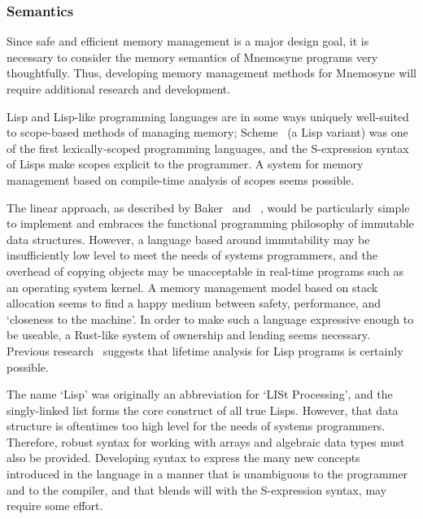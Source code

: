 \documentclass[11pt,draft]{article}
\theoremstyle{break}
\begin{document}
\subsubsection{Semantics}

Since safe and efficient memory management is a major design goal, it is necessary to consider the memory semantics of Mnemosyne programs very thoughtfully. Thus, developing memory management methods for Mnemosyne will require additional research and development.

Lisp and Lisp-like programming languages are in some ways uniquely well-suited to scope-based methods of managing memory; Scheme~\cite{r6rs} (a Lisp variant) was one of the first lexically-scoped programming languages, and the S-expression syntax of Lisps make scopes explicit to the programmer. A system for memory management based on compile-time analysis of scopes seems possible.

The linear approach, as described by Baker~\cite{Baker:1992:LLL:142137.142162,Baker:1995:UVL:199818.199860} and \citeauthor{hawblitzel2004low}~\cite{hawblitzel2004low}, would be particularly simple to implement and embraces the functional programming philosophy of immutable data structures. However, a language based around immutability may be insufficiently low level to meet the needs of systems programmers, and the overhead of copying objects may be unacceptable in real-time programs such as an operating system kernel. A memory management model based on stack allocation seems to find a happy medium between safety, performance, and `closeness to the machine'. In order to make such a language expressive enough to be useable, a Rust-like system of ownership and lending seems necessary. Previous research~\cite{sobalvarro1988lifetime} suggests that lifetime analysis for Lisp programs is certainly possible.

The name `Lisp' was originally an abbreviation for `LISt Processing', and the singly-linked list forms the core construct of all true Lisps. However, that data structure is oftentimes too high level for the needs of systems programmers. Therefore, robust syntax for working with arrays and algebraic data types must also be provided. Developing syntax to express the many new concepts introduced in the language in a manner that is unambiguous to the programmer and to the compiler, and that blends will with the S-expression syntax, may require some effort.
\end{document}
